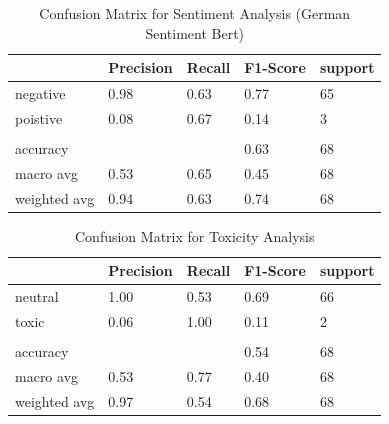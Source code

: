 \begin{table}[h]
\centering
\begin{tabular}{l|llll}
 & Precision & Recall & F1-Score & support \\ \hline
negative & 0.98 & 0.63 & 0.77 & 65\\
poistive & 0.08 & 0.67 & 0.14 & 3 \\ 
\\
accuracy & & & 0.63 & 68\\
macro avg & 0.53 & 0.65 & 0.45 & 68 \\
weighted avg & 0.94 & 0.63 & 0.74 & 68\\
\end{tabular}
\caption{Confusion Matrix for Sentiment Analysis (German Sentiment Bert)}
\label{tab:confusion_matrix}
\end{table}

\begin{table}[h]
\centering
\begin{tabular}{l|llll}
 & Precision & Recall & F1-Score & support \\ \hline
neutral & 1.00 & 0.53 & 0.69 & 66\\
toxic & 0.06 & 1.00 & 0.11 & 2 \\ 
\\
accuracy & & & 0.54 & 68\\
macro avg & 0.53 & 0.77 & 0.40 & 68 \\
weighted avg & 0.97 & 0.54 & 0.68 & 68\\
\end{tabular}
\caption{Confusion Matrix for Toxicity Analysis}
\label{tab:confusion_matrix}
\end{table}


